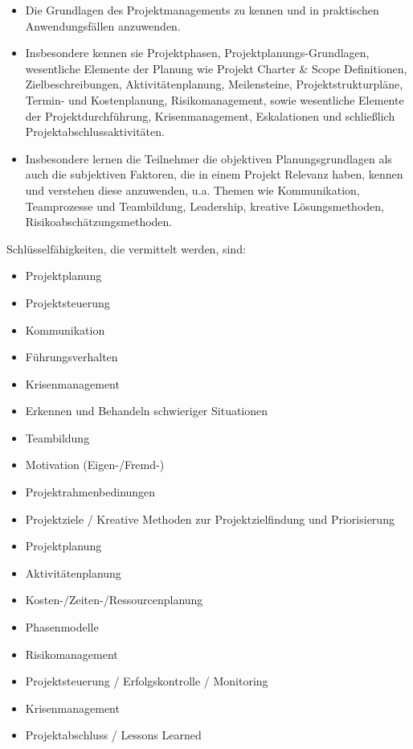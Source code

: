 \begin{course}
\begin{learningoutcomes}
 \begin{itemize}\item Die Grundlagen des Projektmanagements zu kennen und in praktischen Anwendungsfällen anzuwenden.  \item Insbesondere kennen sie Projektphasen, Projektplanungs-Grundlagen, wesentliche Elemente der Planung wie Projekt Charter \& Scope Definitionen, Zielbeschreibungen, Aktivitätenplanung, Meilensteine, Projektstrukturpläne, Termin- und Kostenplanung, Risikomanagement, sowie wesentliche Elemente der Projektdurchführung, Krisenmanagement, Eskalationen und schließlich Projektabschlussaktivitäten.  \item Insbesondere lernen die Teilnehmer die objektiven Planungsgrundlagen als auch die subjektiven Faktoren, die in einem Projekt Relevanz haben, kennen und verstehen diese anzuwenden, u.a. Themen wie Kommunikation, Teamprozesse und Teambildung, Leadership, kreative Lösungsmethoden, Risikoabschätzungsmethoden.  \end{itemize}

Schlüsselfähigkeiten, die vermittelt werden, sind:

 \begin{itemize}\item Projektplanung  \item Projektsteuerung  \item Kommunikation  \item Führungsverhalten  \item Krisenmanagement  \item Erkennen und Behandeln schwieriger Situationen  \item Teambildung  \item Motivation (Eigen-/Fremd-)  \end{itemize}
\end{learningoutcomes}

\begin{content}
\begin{itemize}\item Projektrahmenbedinungen  \item  Projektziele / Kreative Methoden zur Projektzielfindung und Priorisierung  \item  Projektplanung  \item  Aktivitätenplanung  \item  Kosten-/Zeiten-/Ressourcenplanung  \item  Phasenmodelle  \item  Risikomanagement  \item  Projektsteuerung / Erfolgskontrolle / Monitoring  \item  Krisenmanagement  \item  Projektabschluss / Lessons Learned  \end{itemize}
\end{content}


\end{course}
